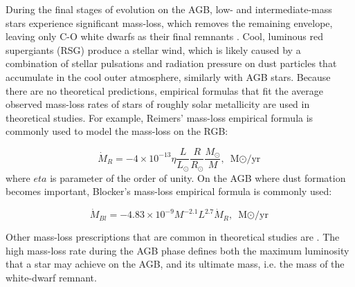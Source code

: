 During the final stages of evolution on the AGB, low- and intermediate-mass stars experience significant mass-loss, which removes the remaining envelope, leaving only C-O white dwarfs as their final remnants \citep{marigo2007evolution, pols2011stellar}. Cool, luminous red supergiants (RSG) produce a stellar wind, which is likely caused by a combination of stellar pulsations and radiation pressure on dust particles that accumulate in the cool outer atmosphere, similarly with AGB stars. Because there are no theoretical predictions, empirical formulas that fit the average observed mass-loss rates of stars of roughly solar metallicity are used in theoretical studies. For example, Reimers' mass-loss empirical formula \citep{reimers1975circumstellar} is commonly used to model the mass-loss on the RGB:

\begin{equation}\label{eq:reimers}
    \dot{M}_{R} = -4 \times 10^{-13} \eta 
    \frac{L}{L_{\odot}}  \frac{R}{R_{\odot}} \frac{M_{\odot}}{M},
    \text{ M${\odot}$/yr}
\end{equation}
where $eta$ is parameter of the order of unity. On the AGB where dust formation becomes important, Blocker's mass-loss empirical formula \citep{bloecker1995stellarI,bloecker1995stellarII} is commonly used:

\begin{equation}\label{eq:reimers}
    \dot{M}_{Bl} = -4.83 \times 10^{-9} M^{-2.1} L^{2.7} \dot{M}_{R},
    \text{ M${\odot}$/yr}
\end{equation}

Other mass-loss prescriptions that are common in theoretical studies are \cite{de1988mass,nieuwenhuijzen1990parametrization}. The high mass-loss rate during the AGB phase defines both the maximum luminosity that a star may achieve on the AGB, and its ultimate mass, i.e. the mass of the white-dwarf remnant.


